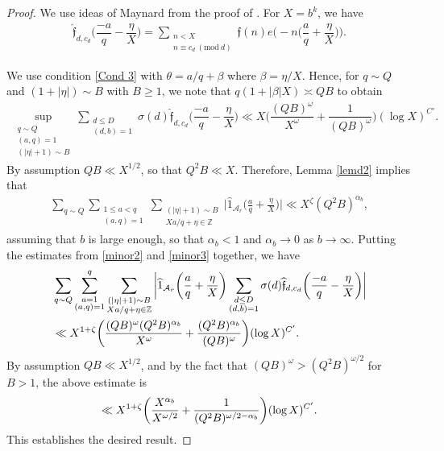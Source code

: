\documentclass[12pt]{amsart}
\numberwithin{equation}{section}
\theoremstyle{remark}
\theoremstyle{definition}
\newcommand{\imod}[1]{\ (\mathrm{mod}\ #1)}
\begin{document}
\begin{proof}
We use ideas of Maynard from the proof of \cite[Lemma 6.1]{May2}.
 For $X=b^k$, we have
\begin{align}
\widehat{\mathfrak{f}}_{d, c_d}\bigg(\dfrac{-a}{q}-\dfrac{\eta}{X}\bigg)=\sum_{\substack{n<X\\n\equiv c_d\imod d}}\mathfrak{f}(n)e\bigg(-n\bigg(\dfrac{a}{q}+\dfrac{\eta}{X}\bigg)\bigg).
\end{align}


We use condition \ref{Cond 3} with $\theta=a/q+\beta$ where $\beta=\eta/X$. Hence, for $q\sim Q$ and $(1+|\eta|)\sim B$ with $B\geq 1$, we note that $q (1 + |\beta|X)\asymp QB$ to obtain
\begin{align}
\label{minor2}\sup_{\substack{q\sim Q\\(a,q)=1\\ (|\eta|+1) \sim B}}\sum_{\substack{d\leq D\\(d, b)=1}}{\sigma}(d)\widehat{\mathfrak{f}}_{d, c_d}\bigg(\dfrac{-a}{q}-\dfrac{\eta}{X}\bigg) \ll X\bigg(\dfrac{(QB)^{\omega}}{X^\omega}+\dfrac{1}{(QB)^{\omega}}\bigg)(\log X)^{C'}.
\end{align}
By assumption $QB\ll X^{1/2}$, so that $Q^2B \ll  X$. Therefore, Lemma \ref{lemd2} implies that
\begin{align}
\label{minor3} \sum_{q\sim Q}\sum_{\substack{1\leq a <q\\(a,q)=1}}\sum_{\substack{(|\eta|+1)\sim B\\X a/q + \eta \in \mathbb{Z}}}\bigg|\widehat{1}_{\mathcal{A}_r}\bigg(\frac{a}{q} + \frac{\eta}{X}\bigg)\bigg| \ll X^{\zeta}(Q^2B)^{\alpha_b},
\end{align}
assuming that $b$ is large enough, so that $\alpha_b < 1$ and $\alpha_b \rightarrow 0$ as $b \rightarrow \infty$.
Putting the estimates from \eqref{minor2} and \eqref{minor3} together, we have
\begin{align}
\notag &\sum_{q\sim Q}\sum_{\substack{a=1\\(a,q)=1}}^q\sum_{\substack{(|\eta|+1)\sim B\\X a/q+\eta \in \mathbb{Z}}}\bigg|\widehat{1}_{\mathcal{A}_r}\bigg(\frac{a}{q}+\frac{\eta}{X}\bigg)\sum_{\substack{d\leq D\\(d, b)=1}}{\sigma}(d)\widehat{\mathfrak{f}}_{d, c_d}\bigg(\dfrac{-a}{q}-\dfrac{\eta}{X}\bigg)\bigg|\\
\notag &\ll X^{1+\zeta}\bigg(\dfrac{(QB)^{\omega}(Q^2B)^{\alpha
_b}}{X^\omega}+\dfrac{(Q^2B)^{\alpha_b}}{(QB)^{\omega}}\bigg)(\log X)^{C'}.
\end{align}
By assumption $QB\ll X^{1/2}$, and by the fact that $(QB)^{\omega}> (Q^2B)^{\omega/2}$ for $B> 1$, the above estimate is
\begin{align} 
\notag \ll X^{1+\zeta}\bigg(\dfrac{X^{\alpha_b }}{X^{\omega/2}}+ \dfrac{1}{(Q^2B)^{\omega/2-\alpha_b}}\bigg)(\log X)^{C'}.
\end{align}
This establishes the desired result.
\end{proof}
\end{document}
